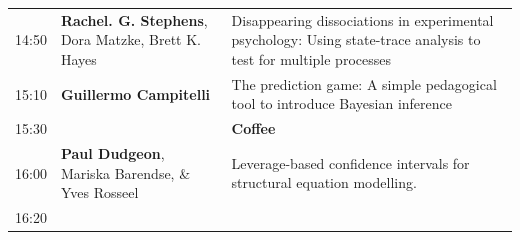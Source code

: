 \documentclass[]{article}
\begin{document}
\begin{longtable}[]{@{}lll@{}}
\begin{minipage}[t]{0.03\columnwidth}\raggedright\strut
14:50\strut
\end{minipage} & \begin{minipage}[t]{0.39\columnwidth}\raggedright\strut
\textbf{Rachel. G. Stephens}, Dora Matzke, Brett K. Hayes\strut
\end{minipage} & \begin{minipage}[t]{0.50\columnwidth}\raggedright\strut
Disappearing dissociations in experimental psychology: Using state-trace
analysis to test for multiple processes\strut
\end{minipage}\tabularnewline
\begin{minipage}[t]{0.03\columnwidth}\raggedright\strut
15:10\strut
\end{minipage} & \begin{minipage}[t]{0.39\columnwidth}\raggedright\strut
\textbf{Guillermo Campitelli}\strut
\end{minipage} & \begin{minipage}[t]{0.50\columnwidth}\raggedright\strut
The prediction game: A simple pedagogical tool to introduce Bayesian
inference\strut
\end{minipage}\tabularnewline
\begin{minipage}[t]{0.03\columnwidth}\raggedright\strut
15:30\strut
\end{minipage} & \begin{minipage}[t]{0.39\columnwidth}\raggedright\strut
\strut
\end{minipage} & \begin{minipage}[t]{0.50\columnwidth}\raggedright\strut
\textbf{Coffee}\strut
\end{minipage}\tabularnewline
\begin{minipage}[t]{0.03\columnwidth}\raggedright\strut
16:00\strut
\end{minipage} & \begin{minipage}[t]{0.39\columnwidth}\raggedright\strut
\textbf{Paul Dudgeon}, Mariska Barendse, \& Yves Rosseel\strut
\end{minipage} & \begin{minipage}[t]{0.50\columnwidth}\raggedright\strut
Leverage-based confidence intervals for structural equation
modelling.\strut
\end{minipage}\tabularnewline
\begin{minipage}[t]{0.03\columnwidth}\raggedright\strut
16:20\strut
\end{minipage} & \begin{minipage}[t]{0.39\columnwidth}\raggedright\strut

\end{minipage}
\end{longtable}
\end{document}
